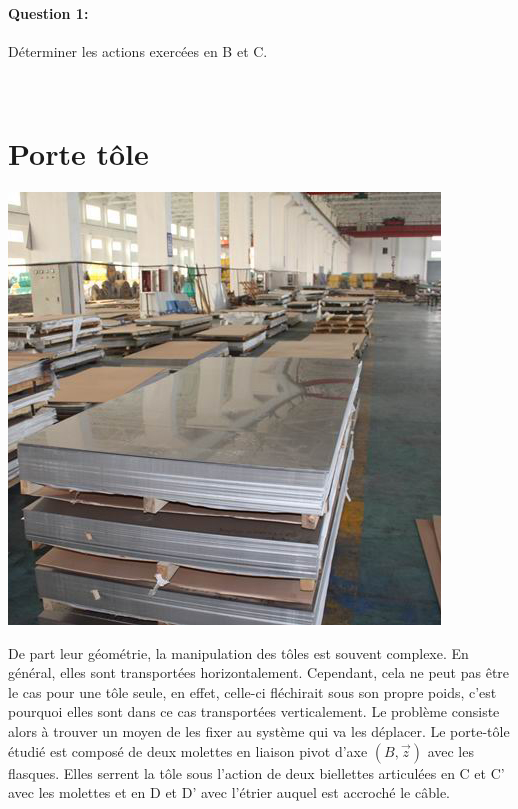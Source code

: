 \paragraph{Question 1:} Déterminer les actions exercées en B et C.

\newpage

~\

\newpage

\section{Porte tôle}

\begin{minipage}{0.4\linewidth}
 \centering\includegraphics[width=0.7\linewidth]{img/tole_hor.jpg}
\end{minipage}
\hfill
\begin{minipage}{0.56\linewidth}
De part leur géométrie, la manipulation des tôles est souvent complexe. En général, elles sont transportées horizontalement. Cependant, cela ne peut pas être le cas pour une tôle seule, en effet, celle-ci fléchirait sous son propre poids, c'est pourquoi elles sont dans ce cas transportées verticalement. Le problème consiste alors à trouver un moyen de les fixer au système qui va les déplacer. Le porte-tôle étudié est composé de deux molettes en liaison pivot d'axe $(B,\overrightarrow{z})$ avec les flasques. Elles serrent la tôle sous l'action de deux biellettes articulées en C et C' avec les molettes et en D et D' avec l'étrier auquel est accroché le câble.
\end{minipage}

